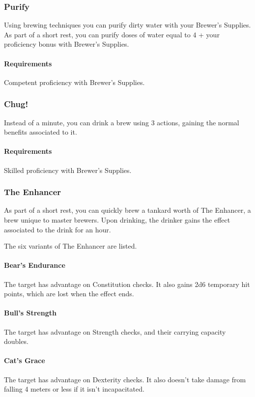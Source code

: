\subsubsection{Purify} \label{feat::purify}
    Using brewing techniques you can purify dirty water with your Brewer's Supplies.
    As part of a short rest, you can purify doses of water equal to 4 + your proficiency bonus with Brewer's Supplies.
    \paragraph{Requirements} Competent proficiency with Brewer's Supplies.
\subsubsection{Chug!} \label{feat::chug}
    Instead of a minute, you can drink a brew using 3 actions, gaining the normal benefits associated to it.
    \paragraph{Requirements} Skilled proficiency with Brewer's Supplies.
\subsubsection{The Enhancer} \label{feat::theenhancer}
    As part of a short rest, you can quickly brew a tankard worth of The Enhancer, a brew unique to master brewers.
    Upon drinking, the drinker gains the effect associated to the drink for an hour.

    The six variants of The Enhancer are listed.
    \paragraph{Bear's Endurance} The target has advantage on Constitution checks.
    It also gains 2d6 temporary hit points, which are lost when the effect ends.
    \paragraph{Bull's Strength} The target has advantage on Strength checks, and their carrying capacity doubles.
    \paragraph{Cat's Grace} The target has advantage on Dexterity checks.
    It also doesn't take damage from falling 4 meters or less if it isn't incapacitated.
